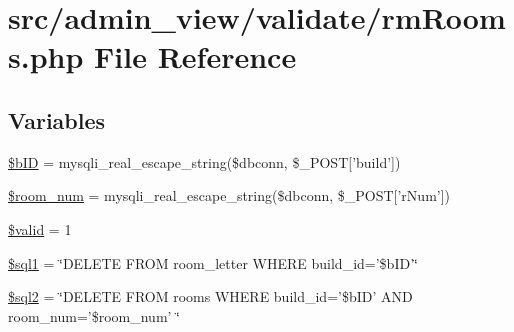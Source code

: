 \hypertarget{rmRooms_8php}{\section{src/admin\-\_\-view/validate/rm\-Rooms.php \-File \-Reference}
\label{rmRooms_8php}
}
\subsection*{\-Variables}
\begin{DoxyCompactItemize}
\item 
\hyperlink{rmRooms_8php_ae8be3ef9b83c4349916cb3e11ea81f9d}{\$b\-I\-D} = mysqli\-\_\-real\-\_\-escape\-\_\-string(\$dbconn, \$\-\_\-\-P\-O\-S\-T\mbox{[}'build'\mbox{]})
\item 
\hyperlink{rmRooms_8php_ac8f3b2b9a28b7619de496a616ba2de94}{\$room\-\_\-num} = mysqli\-\_\-real\-\_\-escape\-\_\-string(\$dbconn, \$\-\_\-\-P\-O\-S\-T\mbox{[}'r\-Num'\mbox{]})
\item 
\hyperlink{rmRooms_8php_a0587674d27d00ef497e08e53ccf45bbb}{\$valid} = 1
\item 
\hyperlink{rmRooms_8php_afe172836ca3d0c604d5bf0378508f614}{\$sql1} = \char`\"{}\-D\-E\-L\-E\-T\-E \-F\-R\-O\-M room\-\_\-letter \-W\-H\-E\-R\-E build\-\_\-id='\$b\-I\-D'\char`\"{}
\item 
\hyperlink{rmRooms_8php_a1ad0ffe3fa0755e56a1a6bb40c232b8a}{\$sql2} = \char`\"{}\-D\-E\-L\-E\-T\-E \-F\-R\-O\-M rooms \-W\-H\-E\-R\-E build\-\_\-id='\$b\-I\-D' \-A\-N\-D room\-\_\-num='\$room\-\_\-num' \char`\"{}
\end{DoxyCompactItemize}


